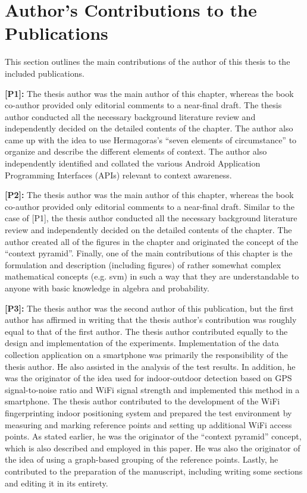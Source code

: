 \section{Author's Contributions to the Publications}
\label{sec:author_contributions}

This section outlines the main contributions of the author of this thesis to the included publications.

\textbf{[P1]:} The thesis author was the main author of this chapter, whereas the book co-author provided only editorial comments to a near-final draft. The thesis author conducted all the necessary background literature review and independently decided on the detailed contents of the chapter. The author also came up with the idea to use Hermagoras's ``seven elements of circumstance'' to organize and describe the different elements of context. The author also independently identified and collated the various Android Application Programming Interfaces (APIs) relevant to context awareness.

\textbf{[P2]:} The thesis author was the main author of this chapter, whereas the book co-author provided only editorial comments to a near-final draft. Similar to the case of [P1], the thesis author conducted all the necessary background literature review and independently decided on the detailed contents of the chapter. The author created all of the figures in the chapter and originated the concept of the ``context pyramid''. Finally, one of the main contributions of this chapter is the formulation and description (including figures) of rather somewhat complex mathematical concepts (e.g. \acrlong{svm}) in such a way that they are understandable to anyone with basic knowledge in algebra and probability.

\textbf{[P3]:} The thesis author was the second author of this publication, but the first author has affirmed in writing that the thesis author's contribution was roughly equal to that of the first author. The thesis author contributed equally to the design and implementation of the experiments. Implementation of the data collection application on a smartphone was primarily the responsibility of the thesis author. He also assisted in the analysis of the test results. In addition, he was the originator of the idea used for indoor-outdoor detection based on GPS signal-to-noise ratio and WiFi signal strength and implemented this method in a smartphone. The thesis author contributed to the development of the WiFi fingerprinting indoor positioning system and prepared the test environment by measuring and marking reference points and setting up additional WiFi access points. As stated earlier, he was the originator of the ``context pyramid'' concept, which is also described and employed in this paper. He was also the originator of the idea of using a graph-based grouping of the reference points. Lastly, he contributed to the preparation of the manuscript, including writing some sections and editing it in its entirety.

